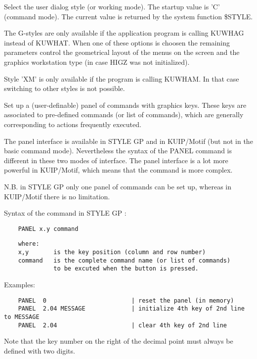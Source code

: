    \par
Select the user dialog style (or working mode).  The startup value is 'C' 
   (command mode).  The current value is returned by the system function 
   \$STYLE.  

   \par
The G-styles are only available if the application program is calling 
   KUWHAG instead of KUWHAT.  When one of these options is choosen the 
   remaining parameters control the geometrical layout of the menus on the 
   screen and the graphics workstation type (in case HIGZ was not 
   initialized).  

   \par
Style 'XM' is only available if the program is calling KUWHAM.  In that 
   case switching to other styles is not possible.  

\ENDCMD


\BEGARG
{}
\ENDARG

   \par
Set up a (user-definable) panel of commands with graphics keys.  These keys 
   are associated to pre-defined commands (or list of commands), which are 
   generally corresponding to actions frequently executed.  

   \par
The \DQUOTE{}panel interface\DQUOTE{} is available in \DQUOTE{}STYLE 
   GP\DQUOTE{} and in KUIP/Motif (but not in the basic command mode). 
   Nevertheless the syntax of the PANEL command is different in these two 
   modes of interface.  The \DQUOTE{}panel interface\DQUOTE{} is a lot more 
   powerful in KUIP/Motif, which means that the command is more complex.  

   \par
N.B. in \DQUOTE{}STYLE GP\DQUOTE{} only one panel of commands can be set 
   up, whereas in KUIP/Motif there is no limitation.  

   \par
Syntax of the command in \DQUOTE{}STYLE GP\DQUOTE{} :  

\begin{verbatim}
    PANEL x.y command
\end{verbatim}
\begin{verbatim}
    where:
    x,y       is the key position (column and row number)
    command   is the complete command name (or list of commands)
              to be excuted when the button is pressed.
\end{verbatim}
\ENDVERB
   \par
Examples:  
\begin{verbatim}
    PANEL  0                        | reset the panel (in memory)
    PANEL  2.04 MESSAGE             | initialize 4th key of 2nd line to MESSAGE
    PANEL  2.04                     | clear 4th key of 2nd line
\end{verbatim}
   \par
Note that the key number on the right of the decimal point must always be 
   defined with two digits.  

